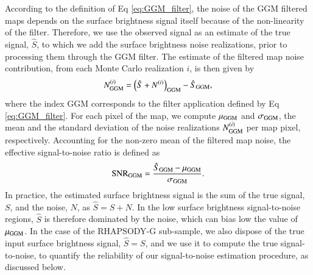 \documentclass[twocolumn,traditabstract]{aa}
\begin{document}
According to the definition of Eq \ref{eq:GGM_filter}, the noise of the GGM filtered maps depends on the surface brightness signal itself because of the non-linearity of the filter. Therefore, we use the observed signal as an estimate of the true signal, $\hat{S}$, to which we add the surface brightness noise realizations, prior to processing them through the GGM filter. The estimate of the filtered map noise contribution, from each Monte Carlo realization $i$, is then given by
\begin{equation}
	N^{(i)}_{\rm GGM} = \left(\hat{S} + N^{(i)}\right)_{\rm GGM} -  \hat{S}_{\rm GGM},
	\label{eq:GGM_filter_noise}
\end{equation}
where the index GGM corresponds to the filter application defined by Eq \ref{eq:GGM_filter}. For each pixel of the map, we compute $\mu_{\rm GGM}$ and $\sigma_{\rm GGM}$, the mean and the standard deviation of the noise realizations $N^{(i)}_{\rm GGM}$ per map pixel, respectively. Accounting for the non-zero mean of the filtered map noise, the effective signal-to-noise ratio is defined as 
\begin{equation}
{\rm SNR}_{\rm GGM} = \frac{\hat{S}_{\rm GGM} - \mu_{\rm GGM}}{\sigma_{\rm GGM}}.
	\label{eq:GGM_filter_snr}
\end{equation}
In practice, the estimated surface brightness signal is the sum of the true signal, $S$, and the noise, $N$, as $\hat{S} = S + N$. In the low surface brightness signal-to-noise regions, $\hat{S}$ is therefore dominated by the noise, which can bias low the value of $\mu_{\rm GGM}$. In the case of the RHAPSODY-G sub-sample, we also dispose of the true input surface brightness signal, $\hat{S} = S$, and we use it to compute the true signal-to-noise, to quantify the reliability of our signal-to-noise estimation procedure, as discussed below.
\end{document}
